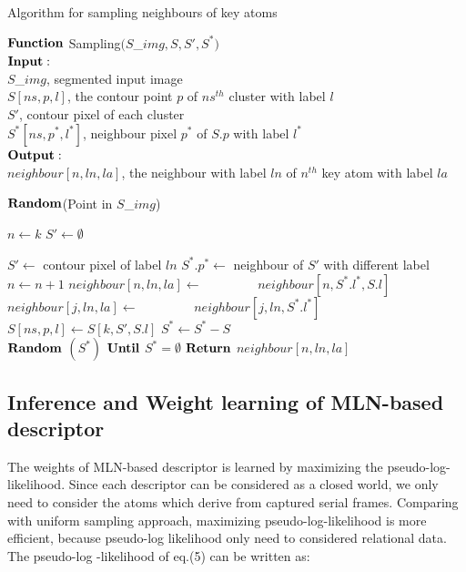 \documentclass[journal]{IEEEtran}
\begin{document}
\begin{algorithm}
  \caption{Algorithm for sampling neighbours of key atoms}
   $\bf{Function}$ Sampling$(S$\_$img,S,S',S^*)$\\ 
  $\bf{Input:}$\\
   $S$\_$img$, segmented input image\\
   $S[ns,p,l]$, the contour point $p$ of $ns^{th}$ cluster with label $l$\\
   $S'$, contour pixel of each cluster\\
   $S^*[ns,p^*,l^*]$, neighbour pixel $p^*$ of $S.p$ with label $l^*$\\ 
  $\bf{Output:}$\\
  $neighbour[n,ln,la]$, the neighbour with label $ln$ of $n^{th}$ key atom with label  $la$         
  \begin{algorithmic}[1]
    \State $\bf{Random}$(Point in $S$\_$img$)
    
      \State $n\leftarrow k$
      \State $S'\leftarrow\emptyset$
     
      \State $S'\leftarrow$ contour pixel of label $ln$
      \State $S^*.p^*\leftarrow$ neighbour of $S'$ with different label
      	\State $n\leftarrow n+1$
      	\State $neighbour[n,ln,la]\leftarrow$
      	\State $\qquad\qquad neighbour[n,S^*.l^*,S.l]$
      	\EndIf 
      	\State $neighbour[j,ln,la]\leftarrow $
      	\State $\qquad\qquad neighbour[j,ln,S^*.l^*]$
      	\EndFor
      \EndFor
     \State $S[ns,p,l]\leftarrow S[k,S',S.l]$
     \State $S^*\leftarrow S^*-S$  
    \EndFor\\
    
	\State $\bf{Random}$ $(S^*)$
	\State $\bf{Until}$ $S^*=\emptyset$
	\State $\bf{Return}$ $neighbour[n,ln,la]$
    
  \end{algorithmic}
\end{algorithm}

\subsection{Inference and Weight learning of MLN-based descriptor}
The weights of MLN-based descriptor is learned by maximizing the pseudo-log-likelihood. Since each descriptor can be considered as a closed world, we only need to consider the atoms which derive from captured serial frames. Comparing with uniform sampling approach, maximizing pseudo-log-likelihood is more efficient, because pseudo-log likelihood only need to considered relational data. The pseudo-log -likelihood of eq.(5) can be written as:
\end{document}
